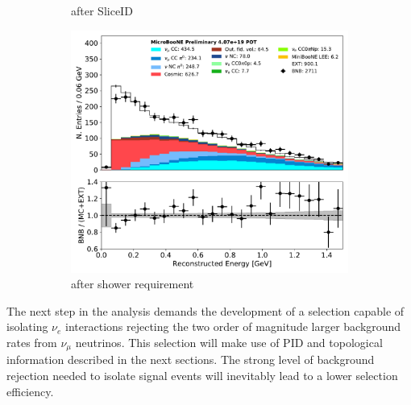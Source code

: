 \documentclass[a4paper]{article}
\begin{document}
\begin{figure}[ht]
\begin{center}
\begin{subfigure}[b]{0.31\textwidth}
    \caption{after SliceID}
    \end{subfigure}
    \begin{subfigure}[b]{0.31\textwidth}
    \centering
    \includegraphics[width=1.00\textwidth]{nureco/reco_e_01152020.pdf}
    \caption{\label{fig:egammasep:dedx} after shower requirement}
    \end{subfigure}
\caption{\label{fig:nuereco}}
\end{center}
\end{figure}

\par The next step in the analysis demands the development of a selection capable of isolating $\nu_e$ interactions rejecting the two order of magnitude larger background rates from $\nu_{\mu}$ neutrinos. This selection will make use of PID and topological information described in the next sections. The strong level of background rejection needed to isolate signal events will inevitably lead to a lower selection efficiency.
\end{document}
